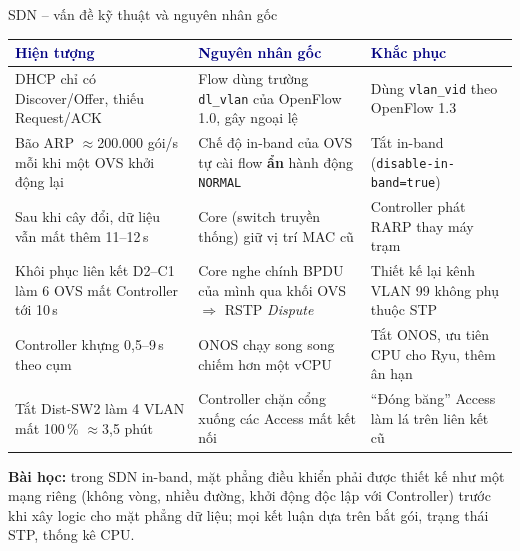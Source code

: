 \documentclass[aspectratio=169, 10pt, xcolor={table}]{beamer}
\renewcommand{\arraystretch}{1.25}
\newcommand{\hd}[1]{\textcolor{navy}{\textbf{#1}}}
\begin{document}
\begin{frame}{SDN -- vấn đề kỹ thuật và nguyên nhân gốc}
    \vspace{0.05cm}
    \scriptsize
    \renewcommand{\arraystretch}{1.2}
    \begin{tabularx}{\textwidth}{@{}L{0.25\textwidth}L{0.36\textwidth}Y@{}}
        \toprule
        \hd{Hiện tượng} & \hd{Nguyên nhân gốc} & \hd{Khắc phục} \\
        \midrule
        DHCP chỉ có Discover/Offer, thiếu Request/ACK & Flow dùng trường \texttt{dl\_vlan} của OpenFlow 1.0, gây ngoại lệ & Dùng \texttt{vlan\_vid} theo OpenFlow 1.3 \\
        Bão ARP $\approx$200.000 gói/s mỗi khi một OVS khởi động lại & Chế độ in-band của OVS tự cài flow \textbf{ẩn} hành động \texttt{NORMAL} & Tắt in-band (\texttt{disable-in-band=true}) \\
        Sau khi cây đổi, dữ liệu vẫn mất thêm 11--12\,s & Core (switch truyền thống) giữ vị trí MAC cũ & Controller phát RARP thay máy trạm \\
        Khôi phục liên kết D2--C1 làm 6 OVS mất Controller tới 10\,s & Core nghe chính BPDU của mình qua khối OVS $\Rightarrow$ RSTP \textit{Dispute} & Thiết kế lại kênh VLAN 99 không phụ thuộc STP \\
        Controller khựng 0,5--9\,s theo cụm & ONOS chạy song song chiếm hơn một vCPU & Tắt ONOS, ưu tiên CPU cho Ryu, thêm ân hạn \\
        Tắt Dist-SW2 làm 4 VLAN mất 100\,\% $\approx$3,5 phút & Controller chặn cổng xuống các Access mất kết nối & ``Đóng băng'' Access làm lá trên liên kết cũ \\
        \bottomrule
    \end{tabularx}
    \vspace{0.08cm}
    \begin{softcard}[accentSoft]\scriptsize
        \textbf{\color{accent}Bài học:} trong SDN in-band, mặt phẳng điều khiển phải được thiết kế như một mạng riêng (không vòng, nhiều đường, khởi động độc lập với Controller)
        trước khi xây logic cho mặt phẳng dữ liệu; mọi kết luận dựa trên bắt gói, trạng thái STP, thống kê CPU.
    \end{softcard}
\end{frame}
\end{document}

